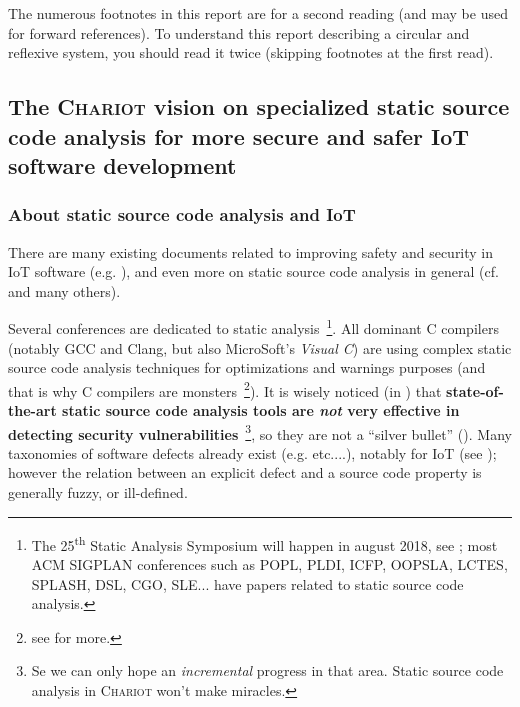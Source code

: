 The numerous footnotes in this report are for a second reading (and
may be used for forward references). To understand this report
describing a circular and reflexive system, you should read it twice
(skipping footnotes at the first read).

\bigskip

\subsection{The \textsc{Chariot} vision on specialized static source code analysis for more secure and safer IoT software development}
\label{subsec:chariotvision}
\subsubsection{About static source code analysis and IoT}

There are many existing documents related to improving safety and
security in IoT software (e.g. \cite{Chen:2011:DAS, Medwed:2016:ISC}),
and even more on static source code analysis in general
(cf. \cite{Gomes2009AnOO, GosevaPopstojanova2015OnTC,
  Binkley:2007:SCA} and many others). %

Several conferences are dedicated to static analysis~\footnote{The
  25\textsuperscript{th} Static Analysis Symposium will happen in
  august 2018, see
  ; most ACM
  SIGPLAN conferences such as POPL, PLDI, ICFP, OOPSLA, LCTES, SPLASH,
  DSL, CGO, SLE... have papers related to static source code
  analysis.}.  All dominant C compilers (notably GCC and Clang, but
also MicroSoft's \emph{Visual C}\texttrademark) are using complex
static source code analysis techniques for optimizations and warnings
purposes (and that is why C compilers are monsters~\footnote{see
  for more.}). It is wisely noticed (in
\cite{GosevaPopstojanova2015OnTC}) that \textbf{state-of-the-art
  static source code analysis tools are \emph{not} very effective in
  detecting  security
  vulnerabilities}~\footnote{Se we can only hope an \emph{incremental}
  progress in that area. Static source code analysis in
  \textsc{Chariot} won't make miracles.}, so they are not a ``silver
bullet''  (\cite{Brooks:1987:NSB}). Many
taxonomies of software defects  already exist
(e.g. \cite{Silva:2016:SES, Wagner:2008:DCD, Levine:2009:DDE}
etc....), notably for IoT (see \cite{Carpent:2018:RRA,
  Ahmad:2018:ModelBasedIoT, Laszlo:2017:Vessedia}); however the
relation between an explicit defect and a source code property is
generally fuzzy, or ill-defined.

